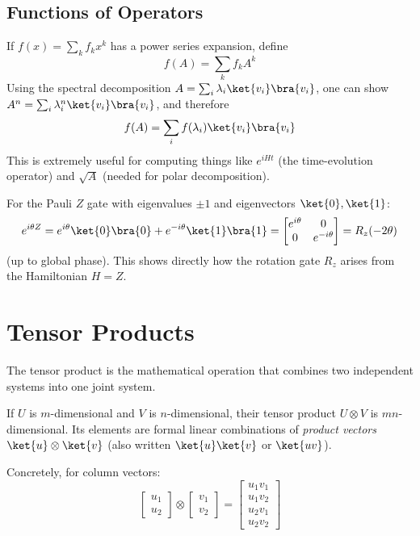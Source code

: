 \documentclass[oneside]{academica}
\begin{document}
\subsection{Functions of Operators}

If $f(x)=\sum_k f_k x^k$ has a power series expansion, define
\begin{equation*}
  f(A) = \sum_k f_k A^k
\end{equation*}
Using the spectral decomposition $A=\sum_i\lambda_i\ket{v_i}\bra{v_i}$, one can show $A^n=\sum_i\lambda_i^n\ket{v_i}\bra{v_i}$, and therefore
\begin{equation*}
  f(A) = \sum_i f(\lambda_i)\ket{v_i}\bra{v_i}
\end{equation*}
This is extremely useful for computing things like $e^{iHt}$ (the time-evolution operator) and $\sqrt{A}$ (needed for polar decomposition).

\begin{example*}
  For the Pauli $Z$ gate with eigenvalues $\pm1$ and eigenvectors $\ket{0},\ket{1}$:
  \begin{equation*}
    e^{i\theta Z} = e^{i\theta}\ket{0}\bra{0} + e^{-i\theta}\ket{1}\bra{1}
    = \begin{bmatrix}e^{i\theta}&0\\0&e^{-i\theta}\end{bmatrix} = R_z(-2\theta)
  \end{equation*}
  (up to global phase).
This shows directly how the rotation gate $R_z$ arises from the Hamiltonian $H=Z$.
\end{example*}

\section{Tensor Products}

The tensor product is the mathematical operation that combines two
independent systems into one joint system.

\begin{definition*}
  If $U$ is $m$-dimensional and $V$ is $n$-dimensional, their tensor
  product $U\otimes V$ is $mn$-dimensional.
Its elements are formal
  linear combinations of \emph{product vectors} $\ket{u}\otimes\ket{v}$
  (also written $\ket{u}\ket{v}$ or $\ket{uv}$).
\end{definition*}

Concretely, for column vectors:
\begin{equation*}
  \begin{bmatrix}u_1\\u_2\end{bmatrix}\otimes\begin{bmatrix}v_1\\v_2\end{bmatrix}
  =\begin{bmatrix}u_1 v_1\\u_1 v_2\\u_2 v_1\\u_2 v_2\end{bmatrix}
\end{equation*}
\end{document}
